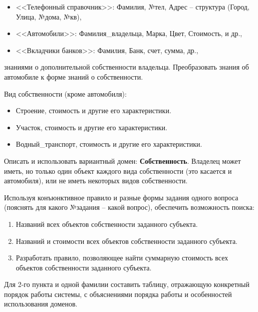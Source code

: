 \documentclass[12pt]{report}
\begin{document}
\begin{itemize}
	\item <<Телефонный справочник>>: Фамилия, №тел, Адрес – структура (Город, Улица, №дома, №кв),
	\item <<Автомобили>>: Фамилия\_владельца, Марка, Цвет, Стоимость, и др.,
	\item <<Вкладчики банков>>: Фамилия, Банк, счет, сумма, др.,
\end{itemize}

знаниями о дополнительной собственности владельца. Преобразовать знания об автомобиле к форме знаний о собственности.

Вид собственности (кроме автомобиля):

\begin{itemize}
	\item Строение, стоимость и другие его характеристики.
	\item Участок, стоимость и другие его характеристики.
	\item Водный\_транспорт, стоимость и другие его характеристики.
\end{itemize}

Описать и использовать вариантный домен: \textbf{Собственность}. Владелец может иметь, но только один объект каждого вида собственности (это касается и автомобиля), или не иметь некоторых видов собственности. 

Используя конъюнктивное правило и разные формы задания одного вопроса (пояснять для какого №задания – какой вопрос), обеспечить возможность поиска:

\begin{enumerate}
	\item Названий всех объектов собственности заданного субъекта.
	\item Названий и стоимости всех объектов собственности заданного субъекта.
	\item Разработать правило, позволяющее найти суммарную стоимость всех объектов собственности заданного субъекта.
\end{enumerate}

Для 2-го пункта и одной фамилии составить таблицу, отражающую конкретный порядок работы системы, с объяснениями порядка работы и особенностей использования доменов.
\end{document}
